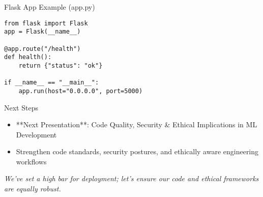 \documentclass[aspectratio=169]{beamer}
\begin{document}
\begin{frame}{Flask App Example (app.py)}
\begin{verbatim}
from flask import Flask
app = Flask(__name__)

@app.route("/health")
def health():
    return {"status": "ok"}

if __name__ == "__main__":
    app.run(host="0.0.0.0", port=5000)
\end{verbatim}
\end{frame}

%
%
\begin{frame}{Next Steps}
\begin{itemize}
\item **Next Presentation**: Code Quality, Security & Ethical Implications in ML Development
\item Strengthen code standards, security postures, and ethically aware engineering workflows
\end{itemize}

\emph{We’ve set a high bar for deployment; let’s ensure our code and ethical frameworks are equally robust.}
\end{frame}
\end{document}

